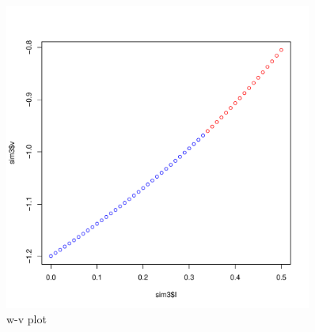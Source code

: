 \documentclass[8pt]{article}\usepackage[]{graphicx}\usepackage[]{color}
\makeatletter
\newenvironment{kframe}{%
 \def\at@end@of@kframe{}%
 \ifinner\ifhmode%
  \def\at@end@of@kframe{\end{minipage}}%
  \begin{minipage}{\columnwidth}%
 \fi\fi%
 \def\FrameCommand##1{\hskip\@totalleftmargin \hskip-\fboxsep
 \colorbox{shadecolor}{##1}\hskip-\fboxsep
     \hskip-\linewidth \hskip-\@totalleftmargin \hskip\columnwidth}%
 \MakeFramed {\advance\hsize-\width
   \@totalleftmargin\z@ \linewidth\hsize
   \@setminipage}}%
 {\par\unskip\endMakeFramed%
 \at@end@of@kframe}
\newenvironment{knitrout}{}{} %
\makeatother
\begin{document}
\begin{enumerate}
\begin{knitrout}
\begin{kframe}
{\ttfamily\noindent\color{warningcolor}{\#\# Warning in xy.coords(x, y, xlabel, ylabel, log): imaginary parts discarded in coercion}}\end{kframe}\begin{figure}
\includegraphics[width=0.9\textwidth]{figure/sol3-1} \caption[w-v plot]{w-v plot}\label{fig:sol3}
\end{figure}


\end{knitrout}
\end{enumerate}
\end{document}
